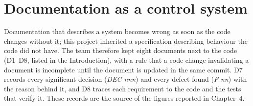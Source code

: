 \documentclass[../main.tex]{subfiles}
\begin{document}
\section{Documentation as a control system}
Documentation that describes a system becomes wrong as soon as the code changes without it; this
project inherited a specification describing behaviour the code did not have. The team therefore
kept eight documents next to the code (D1--D8, listed in the Introduction), with a rule that a code
change invalidating a document is incomplete until the document is updated in the same commit. D7
records every significant decision (\emph{DEC-nnn}) and every defect found (\emph{F-nn}) with the
reason behind it, and D8 traces each requirement to the code and the tests that verify it. These
records are the source of the figures reported in Chapter~4.
\end{document}
